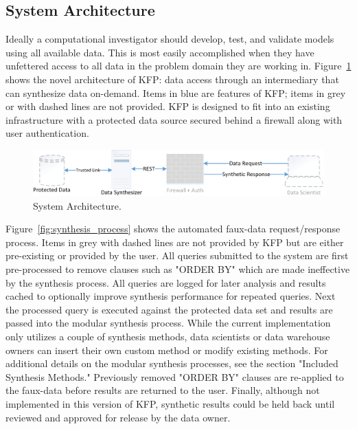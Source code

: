 \documentclass{amia}
\begin{document}
\subsection{System Architecture}

Ideally a computational investigator should develop, test, and validate models using all available data. This is most easily accomplished when they have unfettered access to all data in the problem domain they are working in. Figure~\ref{fig:architecture} shows the novel architecture of KFP: data access through an intermediary that can synthesize data on-demand. Items in blue are features of KFP; items in grey or with dashed lines are not provided. KFP is designed to fit into an existing infrastructure with a protected data source secured behind a firewall along with user authentication. 

\begin{figure}[ht]
  \centering
  \includegraphics[width=\textwidth]{prototype_architecture}
  \caption{System Architecture.}
  \label{fig:architecture}
\end{figure}

Figure~\ref{fig:synthesis_process} shows the automated faux-data request/response process. Items in grey with dashed lines are not provided by KFP but are either pre-existing or provided by the user. All queries submitted to the system are first pre-processed to remove clauses such as "ORDER BY" which are made ineffective by the synthesis process. All queries are logged for later analysis and results cached to optionally improve synthesis performance for repeated queries. Next the processed query is executed against the protected data set and results are passed into the modular synthesis process. While the current implementation only utilizes a couple of synthesis methods, data scientists or data warehouse owners can insert their own custom method or modify existing methods. For additional details on the modular synthesis processes, see the section "Included Synthesis Methods." Previously removed "ORDER BY" clauses are re-applied to the faux-data before results are returned to the user. Finally, although not implemented in this version of KFP, synthetic results could be held back until reviewed and approved for release by the data owner.
\end{document}
